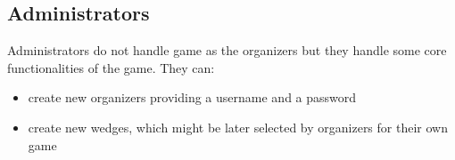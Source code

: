 \subsection{Administrators}
Administrators do not handle game as the organizers but they handle some core functionalities of the game. They can:
	\begin{itemize}
		\item create new organizers providing a username and a password
		\item create new wedges, which might be later selected by organizers for their own game
	\end{itemize}
  
  
  